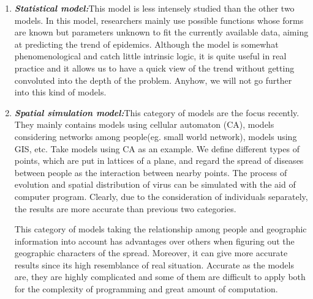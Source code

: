 \begin{enumerate}
  \item \textbf{\emph{Statistical model:}}This model is less intensely studied than the other two models. In this model, researchers mainly use possible functions whose forms are known but parameters unknown to fit the currently available data, aiming at predicting the trend of epidemics. Although the model is somewhat phenomenological and catch little intrinsic logic, it is quite useful in real practice and it allows us to have a quick view of the trend without getting convoluted into the depth of the problem. Anyhow, we will not go further into this kind of models.
  \item \textbf{\emph{Spatial simulation model:}}This category of models are the focus recently. They mainly contains models using cellular automaton (CA), models considering networks among people(eg. small world network), models using GIS\cite{GIS}, etc. Take models using CA as an example. We define different types of points, which are put in lattices of a plane, and regard the spread of diseases between people as the interaction between nearby points. The process of evolution and spatial distribution of virus can be simulated with the aid of computer program. Clearly, due to the consideration of individuals separately, the results are more accurate than previous two categories.
  
  This category of models taking the relationship among people and geographic information into account has advantages over others when figuring out the geographic characters of the spread. Moreover, it can give more accurate results since its high resemblance of real situation. Accurate as the models are, they are highly complicated and some of them are difficult to apply both for the complexity of programming and great amount of computation.
\end{enumerate}